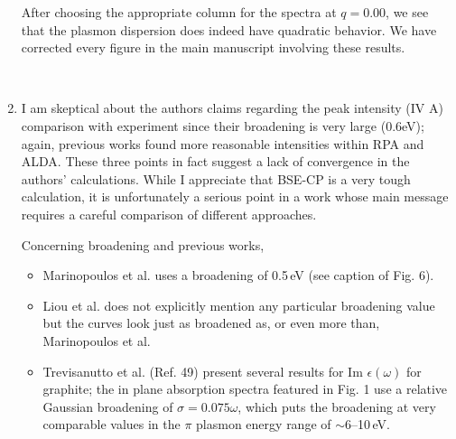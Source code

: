 \documentclass[aps,prb,10pt,endfloats]{revtex4-1}
\begin{document}
\begin{enumerate}
\begin{shaded*}
After choosing the appropriate column for the spectra at $q=0.00$, we see that
the plasmon dispersion does indeed have quadratic behavior. We have corrected
every figure in the main manuscript involving these results.
\end{shaded*}

\begin{figure}[t]
\centering
{}
~
\caption{}
\label{fig:eels}
\end{figure}


\item
I am skeptical about the authors claims regarding the peak intensity (IV A)
comparison with experiment since their broadening is very large (0.6eV); again,
previous works found more reasonable intensities within RPA and ALDA. These
three points in fact suggest a lack of convergence in the authors' calculations.
While I appreciate that BSE-CP is a very tough calculation, it is unfortunately
a serious point in a work whose main message requires a careful comparison of
different approaches.
\begin{shaded*}
Concerning broadening and previous works,
\begin{itemize}
\item Marinopoulos et al. uses a broadening of 0.5\,eV (see caption of Fig. 6).
\item Liou et al. does not explicitly mention any particular broadening value
but the curves look just as broadened as, or even more than, Marinopoulos et al.
\item Trevisanutto et al. (Ref. 49) present several results for Im
$\epsilon(\omega)$ for graphite; the in plane absorption spectra featured in
Fig. 1 use a relative Gaussian broadening of $\sigma = 0.075\omega$, which puts
the broadening at very comparable values in the $\pi$ plasmon energy range of
$\sim$6--10\,eV.
\end{itemize}


\end{shaded*}
\end{enumerate}
\end{document}
